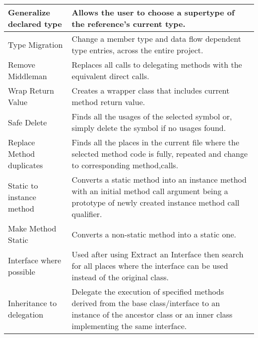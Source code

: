 \begin{table}[h]
\begin{tabular}{p{3 cm} | p{10.5 cm}}
Generalize declared type  & Allows the user to choose a supertype of the reference's current type.                                                                                                    \\ \hline
Type Migration            & Change a member type and data flow dependent type entries, across the entire project.                                                                                     \\ \hline
Remove Middleman          & Replaces all calls to delegating methods with the equivalent direct calls.                                                                                                \\ \hline
Wrap Return Value         & Creates a wrapper class that includes current method return value.                                                                                                        \\ \hline
Safe Delete               & Finds all the usages of the selected symbol or, simply delete the symbol if no usages found.                                                                              \\ \hline
Replace Method duplicates & Finds all the places in the current file where the selected method code is fully, repeated and change to corresponding method,calls.                                      \\ \hline
Static to instance method & Converts a static method into an instance method with an initial method call argument being a prototype of newly created instance method call qualifier.                  \\ \hline
Make Method Static        & Converts a non-static method into a static one.                                                                                                                           \\ \hline
Interface where possible  & Used after using Extract an Interface then search for all places where the interface can be used instead of the original class.                                            \\ \hline
Inheritance to delegation & Delegate the execution of specified methods derived from the base class/interface to an instance of the ancestor class or an inner class implementing the same interface. \\ \hline
\end{tabular}
\end{table}